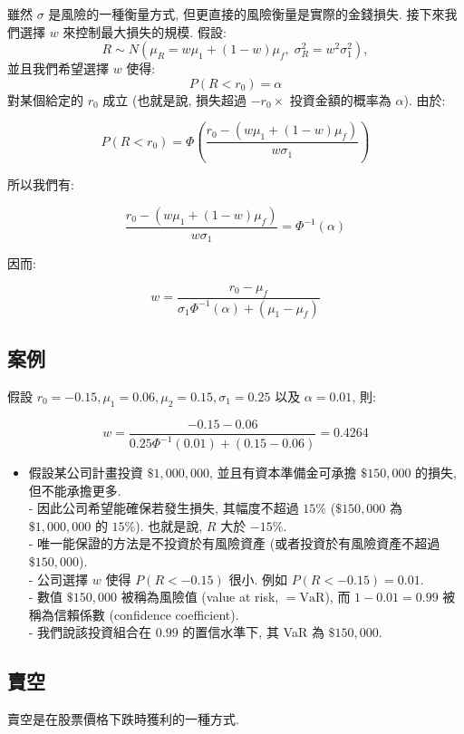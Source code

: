 \documentclass[letterpaper]{article}
\begin{document}
		雖然 $\sigma$ 是風險的一種衡量方式, 但更直接的風險衡量是實際的金錢損失. 接下來我們選擇 $w$ 來控制最大損失的規模. 假設: 
		$$
		R \sim N\left (\mu_{R} = w \mu_{1} + (1-w)\mu_{f}, \; \sigma_{R}^{2} = w^{2}\sigma_{1}^{2}\right), 
		$$
		並且我們希望選擇 $w$ 使得: 
		$$
		P\left (R < r_{0}\right) = \alpha
		$$
		對某個給定的 $r_{0}$ 成立 (也就是說, 損失超過 $-r_{0} \times$ 投資金額的概率為 $\alpha$). 由於: 
		
		$$
		P\left (R<r_{0}\right)=\Phi\left (\frac{r_{0}-\left (w \mu_{1}+ (1-w) \mu_{f}\right)}{w \sigma_{1}}\right)
		$$
		
		所以我們有: 
		
		$$
		\frac{r_{0}-\left (w \mu_{1}+ (1-w) \mu_{f}\right)}{w \sigma_{1}}=\Phi^{-1} (\alpha)
		$$
		
		因而: 
		
		$$
		w=\frac{r_{0}-\mu_{f}}{\sigma_{1} \Phi^{-1} (\alpha)+\left (\mu_{1}-\mu_{f}\right)}
		$$
		
		\subsection{案例}
		假設 $r_{0}=-0.15, \mu_{1}=0.06, \mu_{2}=0.15, \sigma_{1}=0.25$ 以及 $\alpha=0.01$, 則: 
		
		$$
		w=\frac{-0.15-0.06}{0.25 \Phi^{-1} (0.01)+ (0.15-0.06)}=0.4264
		$$
		
		\begin{itemize}
			\item 假設某公司計畫投資 $\$1, 000, 000$, 並且有資本準備金可承擔 $\$150, 000$ 的損失, 但不能承擔更多. \\
			- 因此公司希望能確保若發生損失, 其幅度不超過 $15\%$ ($\$150, 000$ 為 $\$1, 000, 000$ 的 $15\%$). 也就是說, $R$ 大於 $-15\%$. \\
			- 唯一能保證的方法是不投資於有風險資產 (或者投資於有風險資產不超過 $\$150, 000$). \\
			- 公司選擇 $w$ 使得 $P (R < -0.15)$ 很小. 例如 $P (R < -0.15) = 0.01$. \\
			- 數值 $\$150, 000$ 被稱為風險值 (value at risk, $=\mathrm{VaR}$), 而 $1 - 0.01 = 0.99$ 被稱為信賴係數 (confidence coefficient). \\
			- 我們說該投資組合在 $0.99$ 的置信水準下, 其 VaR 為 $\$150, 000$. 
		\end{itemize}
		
		
		\subsection{賣空}
		賣空是在股票價格下跌時獲利的一種方式. 
		
\end{document}
